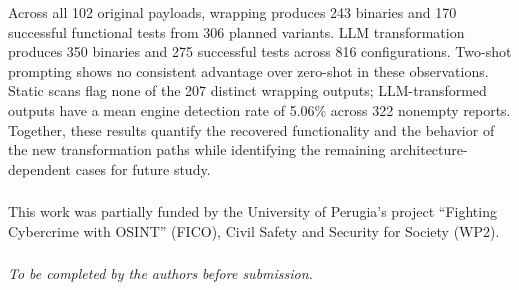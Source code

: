 \documentclass[runningheads]{llncs}
\begin{document}
Across all 102 original payloads, wrapping produces 243 binaries and 170
successful functional tests from 306 planned variants. LLM transformation
produces 350 binaries and 275 successful tests across 816 configurations.
Two-shot prompting shows no consistent advantage over zero-shot in these
observations. Static scans flag none of the 207 distinct wrapping outputs;
LLM-transformed outputs have a mean engine detection rate of 5.06\% across
322 nonempty reports. Together, these results quantify the recovered
functionality and the behavior of the new transformation paths while
identifying the remaining architecture-dependent cases for future study.

\begin{credits}
\subsubsection{\ackname}
This work was partially funded by the University of Perugia's project ``Fighting Cybercrime with OSINT'' (FICO), Civil Safety and Security for Society (WP2).

\subsubsection{\discintname}
\emph{To be completed by the authors before submission.}
\end{credits}



\end{document}
